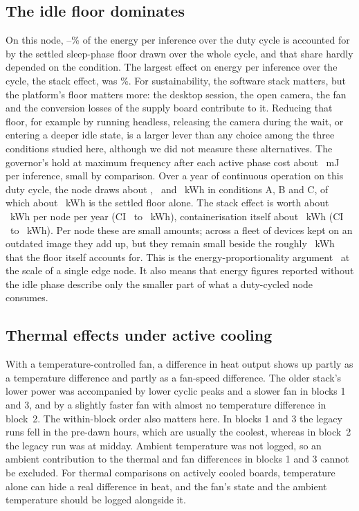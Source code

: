 \documentclass[10pt,journal,compsoc]{IEEEtran}
\begin{document}
\subsection{The idle floor dominates}
On this node, \EBaseShareLo--\EBaseShareHi\% of the energy per inference over the duty cycle is accounted for by the settled sleep-phase floor drawn over the whole cycle, and that share hardly depended on the condition. The largest effect on energy per inference over the cycle, the stack effect, was \ECycCBpctabs\%. For sustainability, the software stack matters, but the platform's floor matters more: the desktop session, the open camera, the fan and the conversion losses of the supply board contribute to it. Reducing that floor, for example by running headless, releasing the camera during the wait, or entering a deeper idle state, is a larger lever than any choice among the three conditions studied here, although we did not measure these alternatives. The governor's hold at maximum frequency after each active phase cost about \HoldmJ~mJ per inference, small by comparison. Over a year of continuous operation on this duty cycle, the node draws about \AnnualkWhA, \AnnualkWhB\ and \AnnualkWhC~kWh in conditions A, B and C, of which about \AnnualFloorkWhA~kWh is the settled floor alone. The stack effect is worth about \AnnualkWhCBabs~kWh per node per year (CI \AnnualkWhCBlo\ to \AnnualkWhCBhi~kWh), containerisation itself about \AnnualkWhBAabs~kWh (CI \AnnualkWhBAlo\ to \AnnualkWhBAhi~kWh). Per node these are small amounts; across a fleet of devices kept on an outdated image they add up, but they remain small beside the roughly \AnnualFloorkWhA~kWh that the floor itself accounts for. This is the energy-proportionality argument~\cite{barroso2007case} at the scale of a single edge node. It also means that energy figures reported without the idle phase describe only the smaller part of what a duty-cycled node consumes.

\subsection{Thermal effects under active cooling}
With a temperature-controlled fan, a difference in heat output shows up partly as a temperature difference and partly as a fan-speed difference. The older stack's lower power was accompanied by lower cyclic peaks and a slower fan in blocks 1 and 3, and by a slightly faster fan with almost no temperature difference in block~2. The within-block order also matters here. In blocks 1 and 3 the legacy runs fell in the pre-dawn hours, which are usually the coolest, whereas in block~2 the legacy run was at midday. Ambient temperature was not logged, so an ambient contribution to the thermal and fan differences in blocks 1 and 3 cannot be excluded. For thermal comparisons on actively cooled boards, temperature alone can hide a real difference in heat, and the fan's state and the ambient temperature should be logged alongside it.
\end{document}
